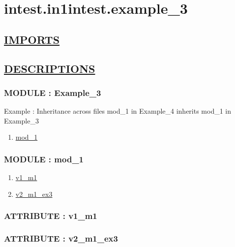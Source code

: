 \chapter*{intest.in1intest.example\_3}

\section*{\underline{IMPORTS}}

\section*{\underline{DESCRIPTIONS}}
\subsection*{MODULE : Example\_3}
\hypertarget{ecldoc:intest.in1intest.example_3_intest.in1intest.Example_3}{}
Example : Inheritance across files mod\_1 in Example\_4 inherits mod\_1 in Example\_3 \\
\begin{enumerate}
\item \hyperlink{ecldoc:intest.in1intest.example_3_intest.in1intest.Example_3.mod_1}{mod\_1}
\end{enumerate}
\subsection*{MODULE : mod\_1}
\hypertarget{ecldoc:intest.in1intest.example_3_intest.in1intest.Example_3.mod_1}{}
\begin{enumerate}
\item \hyperlink{ecldoc:intest.in1intest.example_3_intest.in1intest.example_3.mod_1.v1_m1}{v1\_m1}
\item \hyperlink{ecldoc:intest.in1intest.example_3_intest.in1intest.example_3.mod_1.v2_m1_ex3}{v2\_m1\_ex3}
\end{enumerate}
\subsection*{ATTRIBUTE : v1\_m1}
\hypertarget{ecldoc:intest.in1intest.example_3_intest.in1intest.example_3.mod_1.v1_m1}{}
\subsection*{ATTRIBUTE : v2\_m1\_ex3}
\hypertarget{ecldoc:intest.in1intest.example_3_intest.in1intest.example_3.mod_1.v2_m1_ex3}{}


